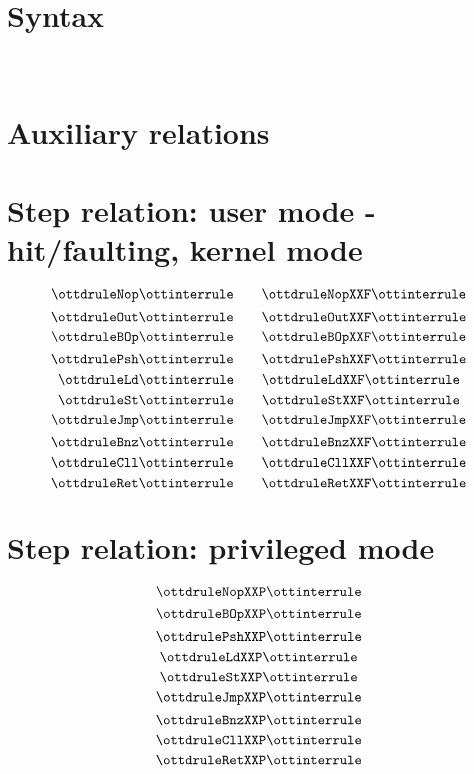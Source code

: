 \documentclass{article}
\begin{document}
\section*{Syntax}

\ottmetavars\\[3ex]

\ottgrammartabular{
\ottn\ottinterrule
\ottpriv\ottinterrule
\ottT\ottinterrule
\ottC\ottinterrule
\ottki\ottinterrule
\ottko\ottinterrule
\ottkbot\ottinterrule
\ottca\ottinterrule
\ottinstr\ottinterrule
\ottcS\ottinterrule
}

\section*{Auxiliary relations}

\ottgrammartabular{
\ottformula\ottinterrule
}

\clearpage
\section*{Step relation: user mode - hit/faulting, kernel mode}

\[ \ottdruleNop \ottinterrule 
   \quad \quad \ottdruleNopXXF \ottinterrule \]
\[ \ottdruleOut \ottinterrule
   \quad \quad  \ottdruleOutXXF \ottinterrule \]
\[ \ottdruleBOp \ottinterrule
   \quad \quad \ottdruleBOpXXF \ottinterrule \]
\[ \ottdrulePsh \ottinterrule 
   \quad \quad \ottdrulePshXXF \ottinterrule \]
 \[ \ottdruleLd \ottinterrule 
   \quad \quad \ottdruleLdXXF \ottinterrule \]
\[ \ottdruleSt \ottinterrule
   \quad \quad \ottdruleStXXF \ottinterrule \]
\[ \ottdruleJmp \ottinterrule
   \quad \quad \ottdruleJmpXXF \ottinterrule \]
\[ \ottdruleBnz \ottinterrule 
   \quad \quad  \ottdruleBnzXXF \ottinterrule  \] 
\[ \ottdruleCll \ottinterrule
   \quad \quad  \ottdruleCllXXF \ottinterrule \]
\[ \ottdruleRet \ottinterrule   
   \quad \quad  \ottdruleRetXXF \ottinterrule \]

\section*{Step relation: privileged mode}

\[ \ottdruleNopXXP \ottinterrule \]
\[ \ottdruleBOpXXP \ottinterrule \]
\[ \ottdrulePshXXP \ottinterrule \]
\[ \ottdruleLdXXP \ottinterrule \]
\[ \ottdruleStXXP \ottinterrule \]
\[ \ottdruleJmpXXP \ottinterrule \]
\[ \ottdruleBnzXXP \ottinterrule \] 
\[ \ottdruleCllXXP \ottinterrule \]
\[ \ottdruleRetXXP \ottinterrule \] 


\end{document}
